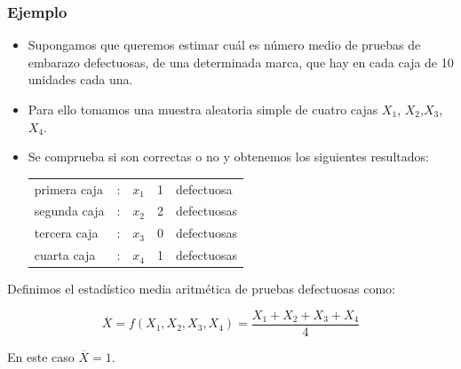 \begin{frame}
\frametitle{Ejemplo}
\begin{itemize}
\item Supongamos que queremos estimar cuál es número medio de pruebas de embarazo defectuosas, de una
 determinada marca, que hay en cada caja de 10 unidades cada una.
\item  Para ello tomamos una muestra aleatoria simple de cuatro cajas 
$X_{1}$, $X_{2}$,$X_{3}$, $X_{4}$.
\item Se comprueba si son correctas o no y  obtenemos  los siguientes resultados:
\begin{center}
      \begin{tabular}{lcccl}
     primera caja &: & $x_1$ &  1 &defectuosa\\
     segunda caja &: & $x_2$ & 2 &defectuosas\\
     tercera caja &: & $x_3$ & 0 &defectuosas\\
     cuarta  caja &: & $x_4$ &1 &defectuosas
     \end{tabular}
\end{center}
\end{itemize}
\end{frame}

\begin{frame}
     Definimos el estadístico media aritmética de  pruebas defectuosas como:

     $$\overline{X}=f(X_{1}, X_{2}, X_{3},
     X_{4})=\frac{X_{1}+X_{2}+X_{3}+X_{4}}{4}$$

     En este caso $\overline{X}=1$.
\end{frame}


